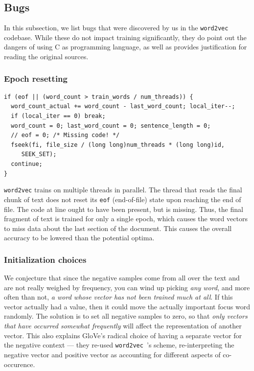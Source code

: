 \documentclass[11pt]{book}
\newcommand*\circled[1]{\tikz[baseline=(char.base)]{
            \node[shape=circle,fill=pairedOneLightBlue,inner sep=1pt] (char) {#1};}}
\newcommand{\wtov}{\texttt{word2vec }}
\begin{document}
\subsection{Bugs}

In this subsection, we list bugs that were discovered by us in the \texttt{word2vec}
codebase. While these do not impact training significantly, they do point out
the dangers of using C as programming language, as well as provides justification
for reading the original sources.

\subsubsection{Epoch resetting}

\begin{verbatim}
if (eof || (word_count > train_words / num_threads)) {
  word_count_actual += word_count - last_word_count; local_iter--;
  if (local_iter == 0) break;
  word_count = 0; last_word_count = 0; sentence_length = 0;
  // eof = 0; /* Missing code! */
  fseek(fi, file_size / (long long)num_threads * (long long)id,
     SEEK_SET);
  continue;
}
\end{verbatim}

\texttt{word2vec} trains on multiple threads in parallel. The thread that reads
the final chunk of text does not reset its \texttt{eof} (end-of-file) state
upon reaching the end of file. The code at line \circled{5} ought to have been present,
but is missing. Thus, the final fragment of text is trained for only a single
epoch, which causes the word vectors to miss data about the last section of the document.
This causes the overall accuracy  to be lowered than the potential optima.

\subsubsection{Initialization choices}

We conjecture that since the negative samples come from all over the text and
are not really weighed by frequency, you can wind up picking \emph{any word},
and more often than not, \emph{a word whose vector has not been trained much at
all}.  If this vector actually had a value, then it could move the actually
important focus word randomly. The solution is to set all negative samples to
zero, so that \emph{only vectors that have occurred somewhat frequently} will
affect the representation of another vector. This also explains GloVe's radical
choice of having a separate vector for the negative context --- they re-used
\wtov's  scheme, re-interpreting the negative vector and positive vector as
accounting for different aspects of co-occurence.
\end{document}
